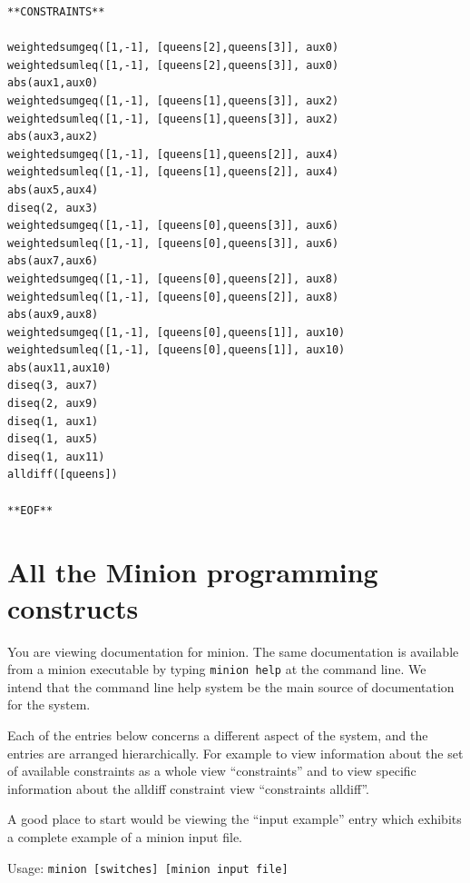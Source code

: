 \documentclass[oneside]{book}
\begin{document}
\begin{verbatim}
**CONSTRAINTS**

weightedsumgeq([1,-1], [queens[2],queens[3]], aux0)
weightedsumleq([1,-1], [queens[2],queens[3]], aux0)
abs(aux1,aux0)
weightedsumgeq([1,-1], [queens[1],queens[3]], aux2)
weightedsumleq([1,-1], [queens[1],queens[3]], aux2)
abs(aux3,aux2)
weightedsumgeq([1,-1], [queens[1],queens[2]], aux4)
weightedsumleq([1,-1], [queens[1],queens[2]], aux4)
abs(aux5,aux4)
diseq(2, aux3)
weightedsumgeq([1,-1], [queens[0],queens[3]], aux6)
weightedsumleq([1,-1], [queens[0],queens[3]], aux6)
abs(aux7,aux6)
weightedsumgeq([1,-1], [queens[0],queens[2]], aux8)
weightedsumleq([1,-1], [queens[0],queens[2]], aux8)
abs(aux9,aux8)
weightedsumgeq([1,-1], [queens[0],queens[1]], aux10)
weightedsumleq([1,-1], [queens[0],queens[1]], aux10)
abs(aux11,aux10)
diseq(3, aux7)
diseq(2, aux9)
diseq(1, aux1)
diseq(1, aux5)
diseq(1, aux11)
alldiff([queens])

**EOF**
\end{verbatim}

\appendix
\chapter{All the Minion programming constructs}
You are viewing documentation for minion. The same 
documentation is available from a minion executable by 
typing \texttt{minion help} at the command line.
We intend that the command line help system be the 
main source of documentation for the system.

Each of the entries below concerns a different aspect
of the system, and the entries are arranged hierarchically.
For example to view information about the set of available
constraints as a whole view ``constraints'' and to view
specific information about the alldiff constraint view 
``constraints alldiff''.

A good place to start would be viewing the 
``input example'' entry which exhibits a complete
example of a minion input file.

Usage: \texttt{minion [switches] [minion input file]}





\end{document}
